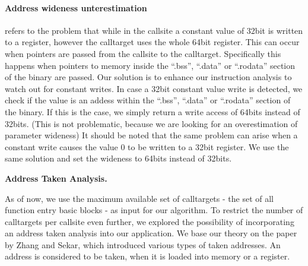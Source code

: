 \paragraph{Address wideness unterestimation} refers to the problem that while in the callsite a constant value of 32bit is written to a register, however the calltarget uses the whole 64bit register. This can occur when pointers are passed from the callsite to the calltarget. Specifically this happens when pointers to memory inside the ``.bss'', ``.data'' or ``.rodata'' section of the binary are passed.
Our solution is to enhance our instruction analysis to watch out for constant writes. In case a 32bit constant value write is detected, we check if the value is an addess within the ``.bss'', ``.data'' or ``.rodata'' section of the binary. If this is the case, we simply return a write access of 64bits instead of 32bits. (This is not problematic, because we are looking for an overestimation of parameter wideness)
It should be noted that the same problem can arise when a constant write causes the value 0 to be written to a 32bit register. We use the same solution and set the wideness to 64bits instead of 32bits.

\textbf{Address Taken Analysis.}
\label{section:addresstakenanalysis}

As of now, we use the maximum available set of calltargets - the set of all function entry basic blocks - as input for our algorithm. To restrict the number of calltargets per callsite even further, we explored the possibility of incorporating an address taken analysis into our application. We base our theory on the paper by Zhang and Sekar\cite{mingwei:sekar}, which introduced various types of taken addresses. An address is considered to be taken, when it is loaded into memory or a register.


